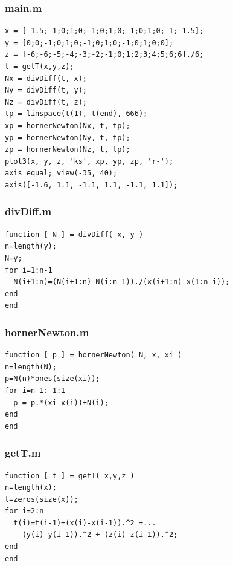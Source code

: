 \documentclass[ngerman,12pt]{article}
\begin{document}
\lstset{language=Matlab,basicstyle=\ttfamily,columns=fixed}
\subsubsection*{main.m}
\begin{lstlisting}[frame=single]
x = [-1.5;-1;0;1;0;-1;0;1;0;-1;0;1;0;-1;-1.5];
y = [0;0;-1;0;1;0;-1;0;1;0;-1;0;1;0;0];
z = [-6;-6;-5;-4;-3;-2;-1;0;1;2;3;4;5;6;6]./6;
t = getT(x,y,z);
Nx = divDiff(t, x);
Ny = divDiff(t, y);
Nz = divDiff(t, z);
tp = linspace(t(1), t(end), 666);
xp = hornerNewton(Nx, t, tp);
yp = hornerNewton(Ny, t, tp);
zp = hornerNewton(Nz, t, tp);
plot3(x, y, z, 'ks', xp, yp, zp, 'r-');
axis equal; view(-35, 40);
axis([-1.6, 1.1, -1.1, 1.1, -1.1, 1.1]);
\end{lstlisting}

\subsubsection*{divDiff.m}
\begin{lstlisting}[frame=single]
function [ N ] = divDiff( x, y )
n=length(y);
N=y;
for i=1:n-1
  N(i+1:n)=(N(i+1:n)-N(i:n-1))./(x(i+1:n)-x(1:n-i));
end
end
\end{lstlisting}
\filbreak
\subsubsection*{hornerNewton.m}
\begin{lstlisting}[frame=single]
function [ p ] = hornerNewton( N, x, xi )
n=length(N);
p=N(n)*ones(size(xi));
for i=n-1:-1:1
  p = p.*(xi-x(i))+N(i);
end
end
\end{lstlisting}

\subsubsection*{getT.m}
\begin{lstlisting}[frame=single]
function [ t ] = getT( x,y,z )
n=length(x);
t=zeros(size(x));
for i=2:n
  t(i)=t(i-1)+(x(i)-x(i-1)).^2 +...
    (y(i)-y(i-1)).^2 + (z(i)-z(i-1)).^2;
end
end
\end{lstlisting}
\end{document}
